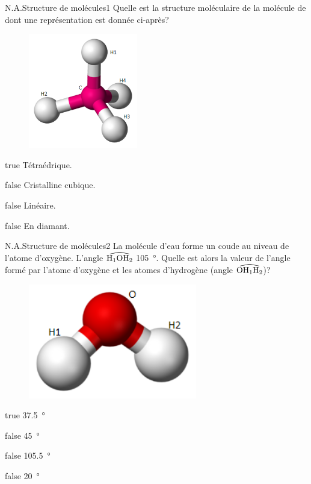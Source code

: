 		\begin{question}{N.A.}{Structure de molécules}{1}{}
			Quelle est la structure moléculaire de la molécule de  dont une représentation est donnée ci-après?
			\begin{figure}
				\centering
				\includegraphics[height = 5cm]{Antoine/Figures_Antoine/300px-Tetrahedral-3D-balls.png}
			\end{figure}
		\end{question}
		\begin{reponses}
			\item[true] Tétraédrique.
			\item[false] Cristalline cubique.
			\item[false] Linéaire.
			\item[false] En diamant.
		\end{reponses}
		\begin{question}{N.A.}{Structure de molécules}{2}{}
			La molécule d'eau forme un coude au niveau de l'atome d'oxygène. L'angle $\widehat{\ce{H}_1\ce{O}\ce{H}_2}$ \SI{105}{\degree}. Quelle est alors la valeur de l'angle formé par l'atome d'oxygène et les atomes d'hydrogène (angle $\widehat{\ce{O}\ce{H}_1\ce{H}_2}$)?
			\begin{figure}
				\centering
				\includegraphics[height = 5cm]{Antoine/Figures_Antoine/240px-Water-3D-balls.png}
			\end{figure}
		\end{question}
		\begin{reponses}
			\item[true] \SI{37.5}{\degree}
				\item[false] \SI{45}{\degree}
				\item[false] \SI{105.5}{\degree}
				\item[false] \SI{20}{\degree}
		\end{reponses}
